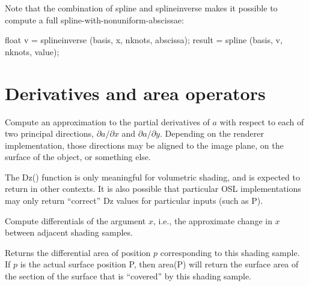 \documentclass[11pt,letterpaper]{book}
\def\P{{\cf P}\xspace}
\begin{document}
Note that the combination of {\cf spline} and {\cf splineinverse} makes
it possible to compute a full spline-with-nonuniform-abscissae:
\begin{smallcode}
    float v = splineinverse (basis, x, nknots, abscissa);
    result = spline (basis, v, nknots, value);
\end{smallcode}
\apiend


\newpage
\section{Derivatives and area operators}
\label{sec:stdlib:derivs}

 
Compute an approximation to the partial derivatives of $a$ with respect to
each of two principal directions, $\partial a / \partial x$ and
$\partial a / \partial y$.  Depending on the renderer
implementation, those directions may be aligned to the image plane,
on the surface of the object, or something else.

The {\cf Dz()} function is only meaningful for volumetric shading, and
is expected to return {} in other contexts.  It is also possible
that particular OSL implementations may only return ``correct'' {\cf Dz}
values for particular inputs (such as \P).
\apiend

Compute differentials of the argument $x$, i.e., the approximate change
in $x$ between adjacent shading samples.
\apiend


Returns the differential area of position $p$ corresponding to this
shading sample.  If $p$ is the actual surface position \P, then 
{\ce area(P)} will return the surface area of the section of the
surface that is ``covered'' by this shading sample.
\apiend
\end{document}
